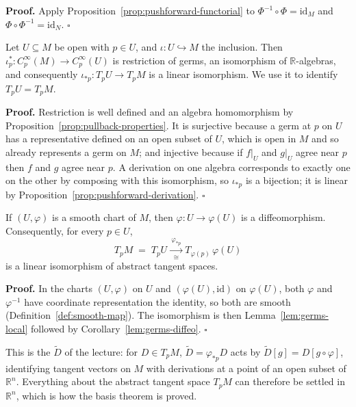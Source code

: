 \documentclass[11pt]{report}
\makeatletter
\newcounter{thmcounter}[section]
\renewenvironment{proof}[1][Proof]{\noindent\textbf{#1.} }{\hfill$\square$\par\vspace{5pt}}
\newcommand{\thmlabel}[1]{\edef\@currentlabel{\arabic{section}.\arabic{thmcounter}}\label{#1}}
\newcommand{\leeref}[1]{\par\smallskip{\raggedleft\footnotesize\textsc{Lee}:\ #1\par}}
\makeatother
\begin{document}
\begin{proof}
Apply Proposition~\ref{prop:pushforward-functorial} to $\Phi^{-1} \circ \Phi = \mathrm{id}_M$ and $\Phi \circ \Phi^{-1} = \mathrm{id}_N$.
\end{proof}

\begin{lembox}\thmlabel{lem:germs-local}
Let $U \subseteq M$ be open with $p \in U$, and $\iota : U \hookrightarrow M$ the inclusion. Then $\iota_p^* : C^\infty_p(M) \to C^\infty_p(U)$ is restriction of germs, an isomorphism of $\mathbb{R}$-algebras, and consequently $\iota_{*p} : T_pU \to T_pM$ is a linear isomorphism. We use it to identify $T_pU = T_pM$.
\leeref{Proposition 3.9}
\end{lembox}

\begin{proof}
Restriction is well defined and an algebra homomorphism by Proposition~\ref{prop:pullback-properties}. It is surjective because a germ at $p$ on $U$ has a representative defined on an open subset of $U$, which is open in $M$ and so already represents a germ on $M$; and injective because if $f|_U$ and $g|_U$ agree near $p$ then $f$ and $g$ agree near $p$. A derivation on one algebra corresponds to exactly one on the other by composing with this isomorphism, so $\iota_{*p}$ is a bijection; it is linear by Proposition~\ref{prop:pushforward-derivation}.
\end{proof}

\begin{propbox}\thmlabel{prop:chart-diffeo}
If $(U, \varphi)$ is a smooth chart of $M$, then $\varphi : U \to \varphi(U)$ is a diffeomorphism. Consequently, for every $p \in U$,
\[
T_pM \;=\; T_pU \xrightarrow[\ \cong\ ]{\ \varphi_{*p}\ } T_{\varphi(p)}\,\varphi(U)
\]
is a linear isomorphism of abstract tangent spaces.
\end{propbox}

\begin{proof}
In the charts $(U,\varphi)$ on $U$ and $(\varphi(U), \mathrm{id})$ on $\varphi(U)$, both $\varphi$ and $\varphi^{-1}$ have coordinate representation the identity, so both are smooth (Definition~\ref{def:smooth-map}). The isomorphism is then Lemma~\ref{lem:germs-local} followed by Corollary~\ref{lem:germs-diffeo}.
\end{proof}

\begin{rembox}\label{rem:chart-pushforward}
This is the $\tilde D$ of the lecture: for $D \in T_pM$, $\tilde D = \varphi_{*p}D$ acts by $\tilde D[g] = D[g \circ \varphi]$, identifying tangent vectors on $M$ with derivations at a point of an open subset of $\mathbb{R}^n$. Everything about the abstract tangent space $T_pM$ can therefore be settled in $\mathbb{R}^n$, which is how the basis theorem is proved.
\end{rembox}
\end{document}
